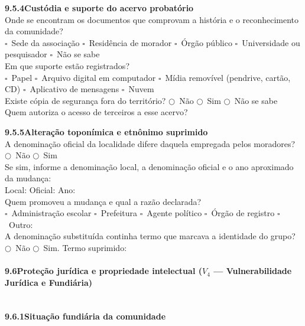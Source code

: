 \medskip\noindent\textbf{9.5.4\quad Custódia e suporte do acervo probatório}\\[2pt]
Onde se encontram os documentos que comprovam a história e o reconhecimento da comunidade?\\
$\square$~Sede da associação \quad $\square$~Residência de morador \quad $\square$~Órgão público \quad $\square$~Universidade ou pesquisador \quad $\square$~Não se sabe\\[2pt]
Em que suporte estão registrados?\\
$\square$~Papel \quad $\square$~Arquivo digital em computador \quad $\square$~Mídia removível (pendrive, cartão, CD) \quad $\square$~Aplicativo de mensagens \quad $\square$~Nuvem\\[2pt]
Existe cópia de segurança fora do território? \quad $\bigcirc$~Não \quad $\bigcirc$~Sim \quad $\bigcirc$~Não se sabe\\[2pt]
Quem autoriza o acesso de terceiros a esse acervo? \dotfill

\medskip\noindent\textbf{9.5.5\quad Alteração toponímica e etnônimo suprimido}\\[2pt]
A denominação oficial da localidade difere daquela empregada pelos moradores?\\
$\bigcirc$~Não \quad $\bigcirc$~Sim\\[2pt]
Se sim, informe a denominação local, a denominação oficial e o ano aproximado da mudança:\\[2pt]
Local: \dotfill\quad Oficial: \dotfill\quad Ano: \dotfill\\[2pt]
Quem promoveu a mudança e qual a razão declarada?\\
$\square$~Administração escolar \quad $\square$~Prefeitura \quad $\square$~Agente político \quad $\square$~Órgão de registro \quad $\square$~Outro: \dotfill\\[2pt]
A denominação substituída continha termo que marcava a identidade do grupo?\\
$\bigcirc$~Não \quad $\bigcirc$~Sim. Termo suprimido: \dotfill

\paragraph{9.6\quad Proteção jurídica e propriedade intelectual ($V_4$ --- Vulnerabilidade Jurídica e Fundiária)}~\\[4pt]

\noindent\textbf{9.6.1\quad Situação fundiária da comunidade}

